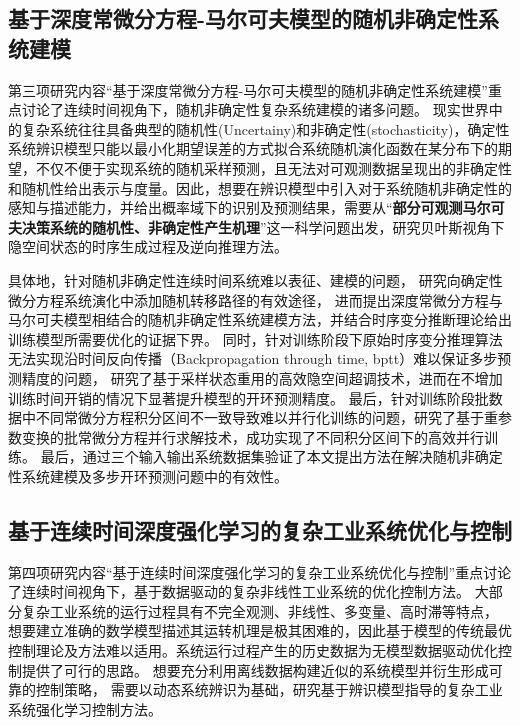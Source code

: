 \subsection{基于深度常微分方程-马尔可夫模型的随机非确定性系统建模}

第三项研究内容“基于深度常微分方程-马尔可夫模型的随机非确定性系统建模”重点讨论了连续时间视角下，随机非确定性复杂系统建模的诸多问题。
现实世界中的复杂系统往往具备典型的随机性(Uncertainy)和非确定性(stochasticity)，确定性系统辨识模型只能以最小化期望误差的方式拟合系统随机演化函数在某分布下的期望，不仅不便于实现系统的随机采样预测，且无法对可观测数据呈现出的非确定性和随机性给出表示与度量。因此，想要在辨识模型中引入对于系统随机非确定性的感知与描述能力，并给出概率域下的识别及预测结果，需要从“\textbf{部分可观测马尔可夫决策系统的随机性、非确定性产生机理}”这一科学问题出发，研究贝叶斯视角下隐空间状态的时序生成过程及逆向推理方法。

具体地，针对随机非确定性连续时间系统难以表征、建模的问题，
研究向确定性微分方程系统演化中添加随机转移路径的有效途径，
进而提出深度常微分方程与马尔可夫模型相结合的随机非确定性系统建模方法，并结合时序变分推断理论给出训练模型所需要优化的证据下界。
同时，针对训练阶段下原始时序变分推理算法无法实现沿时间反向传播（Backpropagation through time, bptt）难以保证多步预测精度的问题，
研究了基于采样状态重用的高效隐空间超调技术，进而在不增加训练时间开销的情况下显著提升模型的开环预测精度。
最后，针对训练阶段批数据中不同常微分方程积分区间不一致导致难以并行化训练的问题，研究了基于重参数变换的批常微分方程并行求解技术，成功实现了不同积分区间下的高效并行训练。
最后，通过三个输入输出系统数据集验证了本文提出方法在解决随机非确定性系统建模及多步开环预测问题中的有效性。
\subsection{基于连续时间深度强化学习的复杂工业系统优化与控制}
第四项研究内容“基于连续时间深度强化学习的复杂工业系统优化与控制”重点讨论了连续时间视角下，基于数据驱动的复杂非线性工业系统的优化控制方法。
大部分复杂工业系统的运行过程具有不完全观测、非线性、多变量、高时滞等特点，
想要建立准确的数学模型描述其运转机理是极其困难的，因此基于模型的传统最优控制理论及方法难以适用。系统运行过程产生的历史数据为无模型数据驱动优化控制提供了可行的思路。
想要充分利用离线数据构建近似的系统模型并衍生形成可靠的控制策略，
需要以动态系统辨识为基础，研究基于辨识模型指导的复杂工业系统强化学习控制方法。

